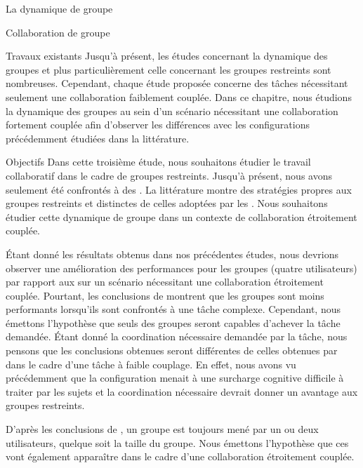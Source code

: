 \documentclass[myfrancais]{mythesis}
\begin{document}
\begin{mychapter}{La dynamique de groupe}
\begin{mysection}{Collaboration de groupe}
\begin{mysubsection}{Travaux existants}
				Jusqu'à présent, les études concernant la dynamique des groupes et plus particulièrement celle concernant les groupes restreints sont nombreuses.
				Cependant, chaque étude proposée concerne des tâches nécessitant seulement une collaboration faiblement couplée.
				Dans ce chapitre, nous étudions la dynamique des groupes au sein d'un scénario nécessitant une collaboration fortement couplée afin d'observer les différences avec les configurations précédemment étudiées dans la littérature.
			\end{mysubsection}
			\begin{mysubsection}{Objectifs}
				Dans cette troisième étude, nous souhaitons étudier le travail collaboratif dans le cadre de groupes restreints.
				Jusqu'à présent, nous avons seulement été confrontés à des .
				La littérature montre des stratégies propres aux groupes restreints et distinctes de celles adoptées par les .
				Nous souhaitons étudier cette dynamique de groupe dans un contexte de collaboration étroitement couplée.

				Étant donné les résultats obtenus dans nos précédentes études, nous devrions observer une amélioration des performances pour les groupes (quatre utilisateurs) par rapport aux  sur un scénario nécessitant une collaboration étroitement couplée.
				Pourtant, les conclusions de  montrent que les groupes sont moins performants lorsqu'ils sont confrontés à une tâche complexe.
				Cependant, nous émettons l'hypothèse que seuls des groupes seront capables d'achever la tâche demandée.
				Étant donné la coordination nécessaire demandée par la tâche, nous pensons que les conclusions obtenues seront différentes de celles obtenues par  dans le cadre d'une tâche à faible couplage.
				En effet, nous avons vu précédemment que la configuration  menait à une surcharge cognitive difficile à traiter par les sujets et la coordination nécessaire devrait donner un avantage aux groupes restreints.

				D'après les conclusions de , un groupe est toujours mené par un ou deux utilisateurs, quelque soit la taille du groupe.
				Nous émettons l'hypothèse que ces  vont également apparaître dans le cadre d'une collaboration étroitement couplée.


\end{mysubsection}
\end{mysection}
\end{mychapter}
\end{document}
